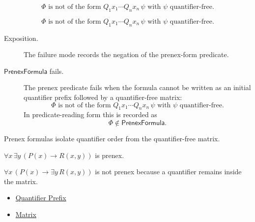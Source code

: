 \begin{remark*}
\[
\Phi \text{ is not of the form } Q_1x_1\cdots Q_nx_n\,\psi
\text{ with } \psi \text{ quantifier-free.}
\]
\end{remark*}

\begin{remark*}
\[
\Phi \text{ is not of the form } Q_1x_1\cdots Q_nx_n\,\psi
\text{ with } \psi \text{ quantifier-free.}
\]
\end{remark*}

\begin{remark*}
\begin{description}
  \item[Exposition.] The failure mode records the negation of the prenex-form
  predicate.
  \item[\(\mathsf{PrenexFormula}\) fails.] The prenex predicate fails when the
  formula cannot be written as an initial quantifier prefix followed by a
  quantifier-free matrix:
  \[
  \Phi \text{ is not of the form } Q_1x_1\cdots Q_nx_n\,\psi
  \text{ with } \psi \text{ quantifier-free.}
  \]
  In predicate-reading form this is recorded as
  \[
  \Phi\notin\mathsf{PrenexFormula}.
  \]
\end{description}
\end{remark*}

\begin{remark*}[Interpretation]
Prenex formulas isolate quantifier order from the quantifier-free matrix.
\end{remark*}

\begin{remark*}[Examples]
\(\forall x\,\exists y\,(P(x)\to R(x,y))\) is prenex.
\end{remark*}

\begin{remark*}
\(\forall x\,(P(x)\to\exists y\,R(x,y))\) is not prenex because a quantifier
remains inside the matrix.
\end{remark*}

\begin{dependencies}
\begin{itemize}
  \item \hyperref[def:quantifier-prefix]{Quantifier Prefix}
  \item \hyperref[def:matrix-prenex]{Matrix}
\end{itemize}
\end{dependencies}

